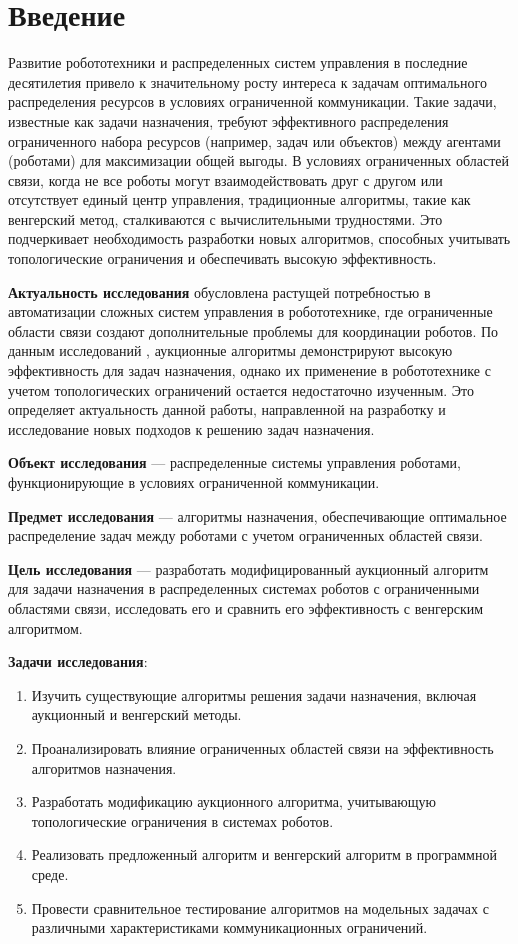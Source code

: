 \chapter*{Введение}

Развитие робототехники и распределенных систем управления в последние десятилетия привело к значительному росту интереса к задачам оптимального распределения ресурсов в условиях ограниченной коммуникации. Такие задачи, известные как задачи назначения, требуют эффективного распределения ограниченного набора ресурсов (например, задач или объектов) между агентами (роботами) для максимизации общей выгоды. В условиях ограниченных областей связи, когда не все роботы могут взаимодействовать друг с другом или отсутствует единый центр управления, традиционные алгоритмы, такие как венгерский метод, сталкиваются с вычислительными трудностями. Это подчеркивает необходимость разработки новых алгоритмов, способных учитывать топологические ограничения и обеспечивать высокую эффективность.

\textbf{Актуальность исследования} обусловлена растущей потребностью в автоматизации сложных систем управления в робототехнике, где ограниченные области связи создают дополнительные проблемы для координации роботов. По данным исследований \cite{bertsekas1990}, аукционные алгоритмы демонстрируют высокую эффективность для задач назначения, однако их применение в робототехнике с учетом топологических ограничений остается недостаточно изученным. Это определяет актуальность данной работы, направленной на разработку и исследование новых подходов к решению задач назначения.

\textbf{Объект исследования} --- распределенные системы управления роботами, функционирующие в условиях ограниченной коммуникации.

\textbf{Предмет исследования} --- алгоритмы назначения, обеспечивающие оптимальное распределение задач между роботами с учетом ограниченных областей связи.

\textbf{Цель исследования} --- разработать модифицированный аукционный алгоритм для задачи назначения в распределенных системах роботов с ограниченными областями связи, исследовать его и сравнить его эффективность с венгерским алгоритмом.

\textbf{Задачи исследования}:
\begin{enumerate}
    \item Изучить существующие алгоритмы решения задачи назначения, включая аукционный и венгерский методы.
    \item Проанализировать влияние ограниченных областей связи на эффективность алгоритмов назначения.
    \item Разработать модификацию аукционного алгоритма, учитывающую топологические ограничения в системах роботов.
    \item Реализовать предложенный алгоритм и венгерский алгоритм в программной среде.
    \item Провести сравнительное тестирование алгоритмов на модельных задачах с различными характеристиками коммуникационных ограничений.
\end{enumerate}

